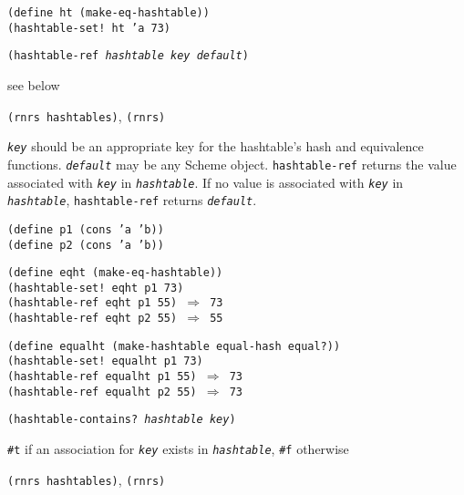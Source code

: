 \begin{alltt}
(define ht (make-eq-hashtable))
(hashtable-set! ht 'a 73)
\end{alltt}

\begin{description}

\label{objects_s281}\item[procedure] \texttt{(hashtable-ref \textit{hashtable} \textit{key} \textit{default})}



\item[returns] see below


\item[libraries] \texttt{(rnrs hashtables)}, \texttt{(rnrs)}
\end{description}

\texttt{\textit{key}} should be an appropriate key for the hashtable's
hash and equivalence functions.
\texttt{\textit{default}} may be any Scheme object.
\texttt{hashtable-ref} returns the value
associated with \texttt{\textit{key}} in \texttt{\textit{hashtable}}.
If no value is associated with \texttt{\textit{key}} in \texttt{\textit{hashtable}},
\texttt{hashtable-ref} returns \texttt{\textit{default}}.

\begin{alltt}
(define p1 (cons 'a 'b))
(define p2 (cons 'a 'b))

(define eqht (make-eq-hashtable))
(hashtable-set! eqht p1 73)
(hashtable-ref eqht p1 55) \(\Rightarrow\) 73
(hashtable-ref eqht p2 55) \(\Rightarrow\) 55

(define equalht (make-hashtable equal-hash equal?))
(hashtable-set! equalht p1 73)
(hashtable-ref equalht p1 55) \(\Rightarrow\) 73
(hashtable-ref equalht p2 55) \(\Rightarrow\) 73
\end{alltt}

\begin{description}

\label{objects_s282}\item[procedure] \texttt{(hashtable-contains? \textit{hashtable} \textit{key})}



\item[returns] \texttt{\#{}t} if an association for \texttt{\textit{key}} exists in \texttt{\textit{hashtable}}, \texttt{\#{}f} otherwise


\item[libraries] \texttt{(rnrs hashtables)}, \texttt{(rnrs)}
\end{description}

